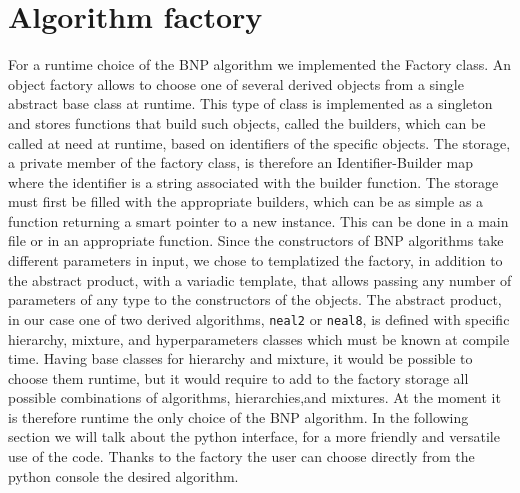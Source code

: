 \section{Algorithm factory}
For a runtime choice of the BNP algorithm we implemented the Factory class.
An object factory allows to choose one of several derived objects from a single abstract base class at runtime.  This type of class is implemented as a singleton and stores functions that build such objects, called the builders, which can be called at need at runtime, based on identifiers of the specific objects. The storage, a private member of the factory class, is therefore an Identifier-Builder map where the identifier is a string associated with the builder function.
 The storage must first be filled with the appropriate builders, which can be as simple as a function returning a smart pointer to a new instance. This can be done in a main file or in an appropriate function.
Since the constructors of BNP algorithms take different parameters in input, we chose to templatized the factory, in addition to the abstract product, with a variadic template, that allows passing any number of parameters of any type to the constructors of the objects. 
The abstract product, in our case one of two derived algorithms, \verb|neal2| or \verb|neal8|, is defined with specific hierarchy, mixture, and hyperparameters classes which must be known at compile time. Having base classes for hierarchy and mixture, it would be possible to choose them runtime, but it would require to add to the factory storage all possible combinations of algorithms, hierarchies,and mixtures.
At the moment it is therefore runtime the only choice of the BNP algorithm.
In the following section we will talk about the python interface, for a more friendly and versatile use of the code. Thanks to the factory the user can choose directly from the python console the desired algorithm.
